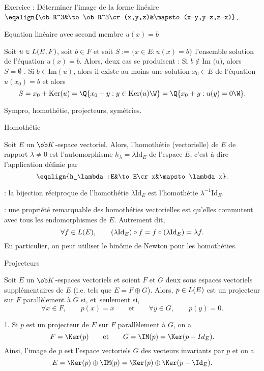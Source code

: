  Exercice :  D\'eterminer l'image de la forme lin\'eaire $\eqalign{\ob R^3&\to\ob R^3\cr(x,y,z)&\mapsto  (x-y,y-z,z-x)}$.
\bigskip

\Concept [] Equation lin\'eaire avec second membre $u(x)=b$

\Propriete [] Soit $u\in\sc L(E,F)$, soit $b\in F$ et soit $S:=\{x\in E:u(x)=b\}$ l'ensemble solution de l'\'equation $u(x)=b$. 
Alors, deux cas se produisent : 
\smallskip\noindent
Si $b\notin\mbox{Im (u)}$, alors  $S=\emptyset$ . 
\smallskip
\noindent
Si $b\in\mbox{Im}(u)$, alors il existe au moins une solution $x_0\in E$ de l'\'equation $u(x_0)=b$ et alors 
$$
S=x_0+\mbox{Ker}(u)=\Q\{x_0+y:y\in\mbox{Ker}(u)\W\}=\Q\{x_0+y:u(y)=0\W\}.
$$ 

\Subsection Sympro, homoth\'etie, projecteurs, sym\'etries.


\Concept [] Homoth\'etie

Soit $E$ un $\ob K$-espace vectoriel. Alors, l'homoth\'etie (vectorielle) de $E$ de rapport $\lambda\neq0$ est 
{l'automorphisme $h_\lambda=\lambda\mbox{Id}_E$} de l'espace $E$, c'est \`a dire l'application d\'efinie par
$$
\eqalign{h_\lambda:E&\to E\cr x&\mapsto \lambda x}.
$$ 


\Remarque : la bijection r\'eciproque de l'homoth\'etie $\lambda\mbox{Id}_E$ est l'homoth\'etie $\lambda^{-1}\mbox{Id}_E$. 
\bigskip


\Remarque : une propri\'et\'e remarquable des homoth\'eties vectorielles est qu'elles commutent avec tous les endomorphismes de $E$. 
Autrement dit, 
$$
\forall f\in\sc L(E), \qquad (\lambda\mbox{Id}_E)\circ f=f\circ(\lambda\mbox{Id}_E)=\lambda f.
$$
En particulier, on peut utiliser le bin\^ome de Newton pour les homoth\'eties. 
\bigskip

\Concept [Index=Projection] Projecteurs

\noindent
Soit $E$ un $\ob K$-espaces vectoriels et soient $F$ et $G$ deux sous espaces vectoriels sup\-pl\'e\-men\-tai\-res de $E$ (i.e. tels que $E=F\oplus G$). 
Alors, $p\in\sc L(E)$ est un projecteur sur $F$ parall\`element \`a $G$ si, et~seulement si, 
$$
\forall x\in F ,\qquad  p(x)=x \qquad\mbox{et}\qquad\forall y\in G , \qquad  p(y)=0 .
$$

\Remarque{} 1. Si $p$ est un projecteur de $E$ sur $F$ parall\`element \`a $G$, on a 
$$
F=\Ker(p) \qquad\mbox{et}\qquad  G=\IM(p)=\Ker(p-Id_E) .
$$
Ainsi, l'image de $p$ est l'espace vectoriels $G$ des vecteurs invariants par $p$ et on a 
$$
E=\Ker(p)\oplus\IM(p)=\Ker(p)\oplus\Ker(p-\Id_E).
$$

